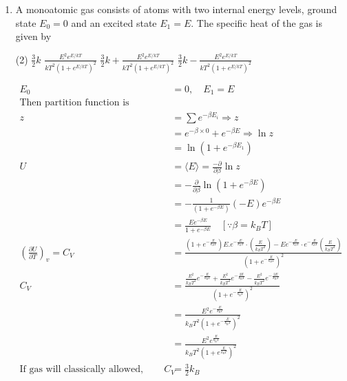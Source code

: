 \begin{enumerate}
	\item A monoatomic gas consists of atoms with two internal energy levels, ground state $E_{0}=0$ and an excited state $E_{1}=E$. The specific heat of the gas is given by
\begin{tasks}(2)
\task[\textbf{A.}] $\frac{3}{2} k$
\task[\textbf{B.}] $\frac{E^{2} e^{E / k T}}{k T^{2}\left(1+e^{E / k T}\right)^{2}}$
\task[\textbf{C.}] $\frac{3}{2} k+\frac{E^{2} e^{E / k T}}{k T^{2}\left(1+e^{E / k T}\right)^{2}}$
\task[\textbf{D.}] $\frac{3}{2} k-\frac{E^{2} e^{E / k T}}{k T^{2}\left(1+e^{E / k T}\right)^{2}}$
\end{tasks}
\begin{answer}
\begin{align*}
E_{0}&=0, \quad E_{1}=E\\
\text{Then partition function is}\\
z&=\sum e^{-\beta E_{i}} \Rightarrow z\\&=e^{-\beta \times 0}+e^{-\beta E} \Rightarrow \ln z\\&=\ln \left(1+e^{-\beta E_{1}}\right)\\
U&=\langle E\rangle=\frac{-\partial}{\partial \beta} \ln z\\&=-\frac{\partial}{\partial \beta} \ln \left(1+e^{-\beta E}\right)\\&=-\frac{1}{\left(1+e^{-\beta E}\right)}(-E) e^{-\beta E}\\&=\frac{E e^{-\beta E}}{1+e^{-\beta E}} \quad\left[\because \beta=k_{B} T\right]\\
\left(\frac{\partial U}{\partial T}\right)_{v}=C_{V}&=\frac{\left(1+e^{-\frac{E}{k_{B} T}}\right) E . e^{-\frac{E}{k_{B} T}} \cdot\left(\frac{E}{k_{B} T^{2}}\right)-E e^{-\frac{E}{k_{B} T}} \cdot e^{-\frac{E}{k_{B} T}}\left(\frac{E}{k_{B} T^{2}}\right)}{\left(1+e^{-\frac{E}{k_{B} T}}\right)^{2}}\\
C_{V}&=\frac{\frac{E^{2}}{k_{B} T^{2}} e^{-\frac{E}{k_{\mathrm{B}} T}}+\frac{E^{2}}{k_{B} T^{2}} e^{-\frac{2 E}{k_{\mathrm{B}} T}}-\frac{E^{2}}{k_{B} T^{2}} e^{-\frac{2 E}{k_{\mathrm{B}} T}}}{\left(1+e^{-\frac{E}{k_{\mathrm{B}} T}}\right)^{2}}\\&=\frac{E^{2} e^{-\frac{E}{k_{\mathrm{B}} T}}}{k_{B} T^{2}\left(1+e^{-\frac{E}{k_{\mathrm{B}} T}}\right)^{2}}\\&=\frac{E^{2} e^{\frac{E}{k_{\mathrm{B}} T}}}{k_{B} T^{2}\left(1+e^{\frac{E}{k_{\mathrm{B}} T}}\right)^{2}}\\
\text{If gas will classically allowed, then }C_{V}&=\frac{3}{2} k_{B}\\

\end{align*}
\end{answer}
\end{enumerate}
